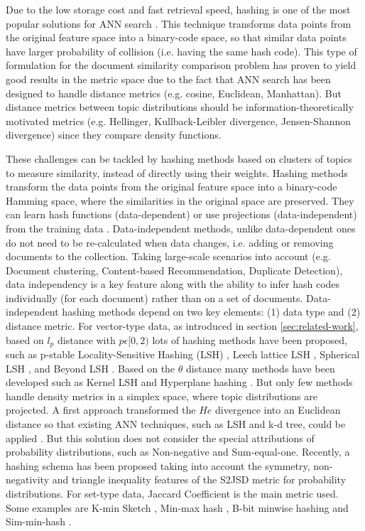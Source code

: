 Due to the low storage cost and fast retrieval speed, hashing is one of the most popular solutions for ANN search \citep{Zhen2016}. This technique transforms data points from the original feature space into a binary-code space, so that similar data points have larger probability of collision (i.e. having the same hash code). This type of formulation for the document similarity comparison problem has proven to yield good results in the metric space \citep{Krstovski2011} due to the fact that ANN search has been designed to handle distance metrics (e.g. cosine, Euclidean, Manhattan). But distance metrics between topic distributions should be information-theoretically motivated metrics (e.g. Hellinger, Kullback-Leibler divergence, Jensen-Shannon divergence) since they compare density functions. 

These challenges can be tackled by hashing methods based on clusters of topics to measure similarity, instead of directly using their weights. Hashing methods transform the data points from the original feature space into a binary-code Hamming space, where the similarities in the original space are preserved. They can learn hash functions (data-dependent) or use projections (data-independent) from the training data \citep{Wang2016}. Data-independent methods, unlike data-dependent ones do not need to be re-calculated when data changes, i.e. adding or removing documents to the collection. Taking large-scale scenarios into account (e.g. Document clustering, Content-based Recommendation, Duplicate Detection), data independency is a key feature along with the ability to infer hash codes individually (for each document) rather than on a set of documents. Data-independent hashing methods depend on two key elements: (1) data type and (2) distance metric. For vector-type data, as introduced in section \ref{sec:related-work}, based on $l_p$ distance with $p \epsilon [0,2)$ lots of hashing methods have been proposed, such as p-stable Locality-Sensitive Hashing (LSH) \citep{Datar2004}, Leech lattice LSH \citep{Andoni2006}, Spherical LSH \citep{Terasawa2007}, and Beyond LSH \citep{Andoni2014}. Based on the $\theta$ distance many methods have been developed such as Kernel LSH \citep{Kulis2012} and Hyperplane hashing \citep{Vijayanarasimhan2014}. But only few methods handle density metrics in a simplex space, where topic distributions are projected. A first approach transformed the $He$ divergence into an Euclidean distance so that existing ANN techniques, such as LSH and k-d tree, could be applied \citep{Krstovski2013a}. But this solution does not consider the special attributions of probability distributions, such as Non-negative and Sum-equal-one. Recently, a hashing schema \citep{Mao2017} has been proposed taking into account the symmetry, non-negativity and triangle inequality features of the S2JSD metric for probability distributions. For set-type data, Jaccard Coefficient is the main metric used. Some examples are K-min Sketch \citep{Li2012}, Min-max hash \citep{Ji2013}, B-bit minwise hashing \citep{Li2010b} and Sim-min-hash \citep{Zhao2013}.

